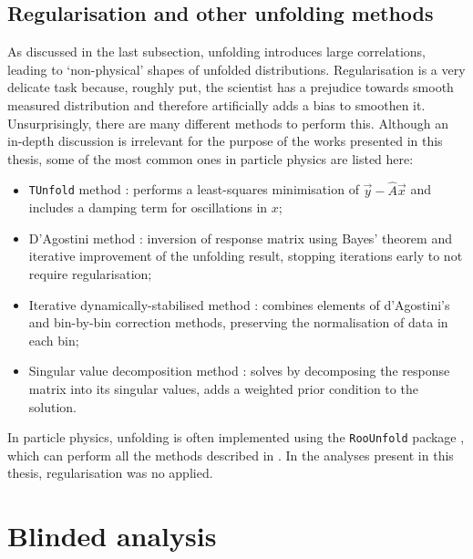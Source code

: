 \subsection{Regularisation and other unfolding methods}
As discussed in the last subsection, unfolding introduces large correlations, leading to `non-physical' shapes of unfolded distributions.
Regularisation is a very delicate task because, roughly put, the scientist has a prejudice towards smooth measured distribution and therefore artificially adds a bias to smoothen it.
Unsurprisingly, there are many different methods to perform this.
Although an in-depth discussion is irrelevant for the purpose of the works presented in this thesis, some of the most common ones in particle physics are listed here:
\begin{itemize}
    \item \texttt{TUnfold} method \cite{Schmitt:2012kp}: performs a least-squares minimisation of $\vec{y}-\hat{A}{\vec{x}}$ and includes a damping term for oscillations in $x$;
    \item D'Agostini method \cite{d2010improved,DAgostini:1994fjx}: inversion of response matrix using Bayes' theorem and iterative improvement of the unfolding result, stopping iterations early to not require regularisation;
    \item Iterative dynamically-stabilised method \cite{Malaescu:2009dm}: combines elements of d'Agostini's and bin-by-bin correction methods, preserving the normalisation of data in each bin;
    \item Singular value decomposition method \cite{Hocker:1995kb}: solves  by decomposing the response matrix into its singular values, adds a weighted prior condition to the solution.
\end{itemize}
In particle physics, unfolding is often implemented using the \texttt{RooUnfold} package \cite{Brenner:2019lmf}, which can perform all the methods described in .
In the analyses present in this thesis, regularisation was no applied.

\section{Blinded analysis}\label{sec:blinding}

